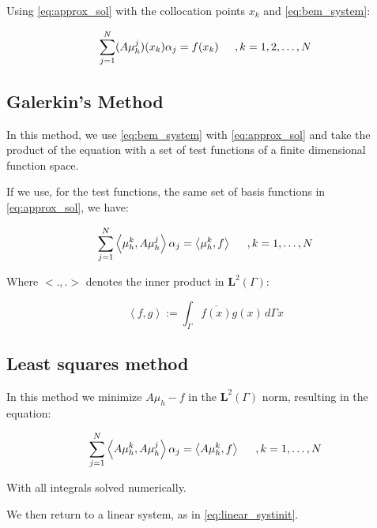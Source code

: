 Using \ref{eq:approx_sol} with the collocation points $x_{k}$ and \ref{eq:bem_system}:

\begin{equation}\label{eq:collocation}
    \sum_{j=1}^{N} (A \mu_{h}^{j})(x_{k}) \alpha_{j} = f(x_{k}) \hspace{0.2in}, k=1,2, \dots, N
\end{equation}

\subsection{Galerkin's Method}

In this method, we use \ref{eq:bem_system} with \ref{eq:approx_sol} and take the product of the equation with a set of test functions of a finite dimensional function space.

If we use, for the test functions, the same set of basis functions in \ref{eq:approx_sol}, we have:

\begin{equation}\label{eq:galerkin}
    \sum_{j=1}^{N} \left<\mu_{h}^{k} ,A\mu_{h}^{j}\right> \alpha_{j} = \left< \mu_{h}^{k},f\right> \hspace{0.2in}, k = 1, \dots, N
\end{equation}

Where $<.,.>$ denotes the inner product in $\mathbf{L}^{2}(\Gamma) $:

\begin{equation}
    \left<f,g\right>:= \int_{\Gamma} \overline{f(x)} g(x) \,d \Gamma x
\end{equation}


\subsection{Least squares method}

In this method we  minimize $A\mu_{h} - f$ in the $\mathbf{L}^{2}(\Gamma)$ norm, resulting in the equation:

\begin{equation}
    \sum_{j=1}^{N} \left< A \mu_{h}^{k},A \mu_{h}^{j} \right>\alpha_{j} = \left<A \mu_{h}^{k},f \right> \hspace{0.2in}, k=1, \dots, N
\end{equation}

With all integrals solved numerically.


We then return to a linear system, as in \ref{eq:linear_systinit}.


